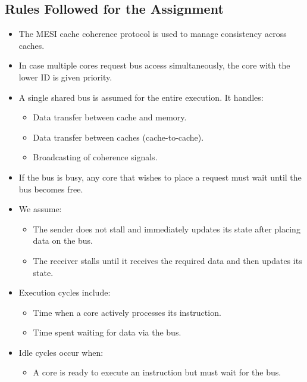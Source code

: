 \documentclass{article}
\begin{document}
\subsection{Rules Followed for the Assignment}

\begin{itemize}
    \item The MESI cache coherence protocol is used to manage consistency across caches.

    \item In case multiple cores request bus access simultaneously, the core with the lower ID is given priority.

    \item A single shared bus is assumed for the entire execution. It handles:
    \begin{itemize}
        \item Data transfer between cache and memory.
        \item Data transfer between caches (cache-to-cache).
        \item Broadcasting of coherence signals.
    \end{itemize}

    \item If the bus is busy, any core that wishes to place a request must wait until the bus becomes free.

    \item We assume:
    \begin{itemize}
        \item The sender does not stall and immediately updates its state after placing data on the bus.
        \item The receiver stalls until it receives the required data and then updates its state.
    \end{itemize}

    \item Execution cycles include:
    \begin{itemize}
        \item Time when a core actively processes its instruction.
        \item Time spent waiting for data via the bus.
    \end{itemize}

    \item Idle cycles occur when:
    \begin{itemize}
        \item A core is ready to execute an instruction but must wait for the bus.
    \end{itemize}
    

\end{itemize}
\end{document}
